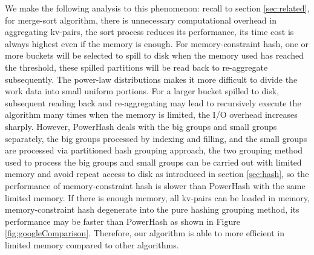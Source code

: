 We make the following analysis to this phenomenon: recall to section \ref{sec:related}, for merge-sort algorithm, there is unnecessary computational overhead in aggregating kv-pairs, the sort process reduces its performance, its time cost is always highest even if the memory is enough. For memory-constraint hash, one or more buckets will be selected to spill to disk when the memory used has reached the threshold, these spilled partitions will be read back to re-aggregate subsequently. The power-law distributions makes it more difficult to divide the work data into small uniform portions. For a larger bucket spilled to disk, subsequent reading back and re-aggregating may lead to recursively execute the algorithm many times when the memory is limited, the I/O overhead increases sharply. However, PowerHash deals with the big groups and small groups separately, the big groups processed by indexing and filling, and the small groups are processed via partitioned hash grouping approach, the two grouping method used to process the big groups and small groups can be carried out with limited memory and avoid repeat access to disk as introduced in section \ref{sec:hash}, so the performance of memory-constraint hash is slower than PowerHash with the same limited memory. If there is enough memory, all kv-pairs can be loaded in memory, memory-constraint hash degenerate into the pure hashing grouping method, its performance may be faster than PowerHash as shown in Figure \ref{fig:googleComparison}. Therefore, our algorithm is able to more efficient in limited memory compared to other algorithms.

